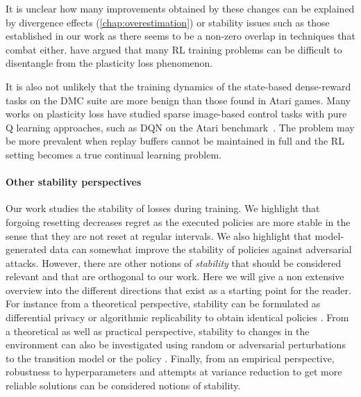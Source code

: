 It is unclear how many improvements obtained by these changes can be explained by divergence effects (\autoref{chap:overestimation}) or stability issues such as those established in our work as there seems to be a non-zero overlap in techniques that combat either. 
\textcite{nauman2024overestimation} have argued that many RL training problems can be difficult to disentangle from the plasticity loss phenomenon.

It is also not unlikely that the training dynamics of the state-based dense-reward tasks on the DMC suite are more benign than those found in Atari games. 
Many works on plasticity loss have studied sparse image-based control tasks with pure Q learning approaches, such as DQN on the Atari benchmark~\textcite{sokar2023dormant, lee2024slow}. 
The problem may be more prevalent when replay buffers cannot be maintained in full and the RL setting becomes a true continual learning problem.

\paragraph{Other stability perspectives} Our work studies the stability of losses during training.
We highlight that forgoing resetting decreases regret as the executed policies are more stable in the sense that they are not reset at regular intervals.
We also highlight that model-generated data can somewhat improve the stability of policies against adversarial attacks.
However, there are other notions of \emph{stability} that should be considered relevant and that are orthogonal to our work. 
Here we will give a non extensive overview into the different directions that exist as a starting point for the reader. For instance from a theoretical perspective, stability can be formulated as differential privacy \parencite{vietri2020private} or algorithmic replicability to obtain identical policies \parencite{eaton2023replicable}. From a theoretical as well as practical perspective, stability to changes in the environment can also be investigated using random or adversarial perturbations to the transition model or the policy \parencite{nilim2005robust, iyengar2005robust, wiesemann2013robust, pinto2017robust}. Finally, from an empirical perspective, robustness to hyperparameters \parencite{ceron2024consistency, patterson2024cross} and attempts at variance reduction to get more reliable solutions \parencite{anschel2017averaged, kuang2023variance} can be considered notions of stability.




